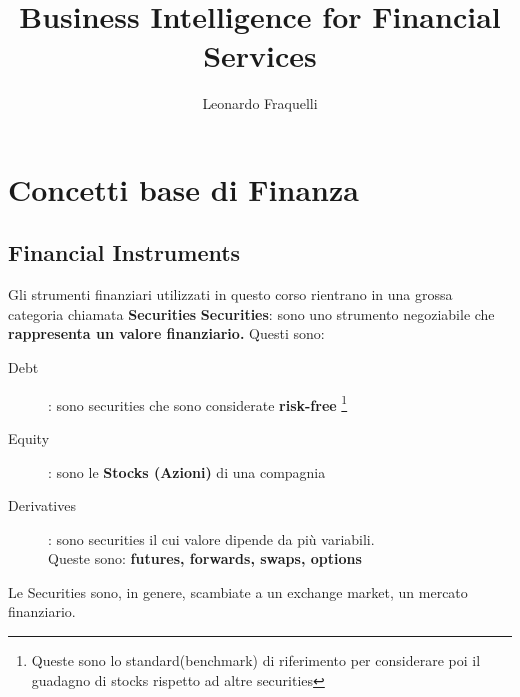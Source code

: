 \documentclass[a4paper,11pt]{report}
\title{ Business Intelligence for Financial Services}
\author {Leonardo Fraquelli }
\begin{document}
\maketitle
{%



\part{Concetti base di Finanza}

\chapter{Financial Instruments}
Gli strumenti finanziari utilizzati in questo corso rientrano in una grossa categoria chiamata {\bfseries Securities} \newline
{\bfseries Securities}: sono uno strumento negoziabile che {\bfseries rappresenta un valore finanziario.} \newline
Questi sono: 
\begin{description}    %

\item[Debt]: sono securities che sono considerate \textbf{risk-free} \footnote{Queste sono lo standard(benchmark) di riferimento per considerare poi il guadagno di stocks rispetto ad altre securities}
\item[Equity]: sono le \textbf{Stocks (Azioni)} di una compagnia
\item[Derivatives]: sono securities il cui valore dipende da più variabili. \\ Queste sono: \bfseries {futures, forwards, swaps, options}
\end{description}
Le Securities sono, in genere, scambiate a un exchange market, un mercato finanziario. \newpage

}
\end{document}
